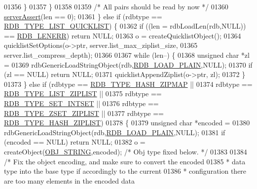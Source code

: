 \begin{DoxyCode}
{{{{{{{{{{{{{{{{{{{{{{{01356             \}
01357         \}
01358 
01359         \textcolor{comment}{/* All pairs should be read by now */}
01360         \hyperlink{server_8h_a88114b5169b4c382df6b56506285e56a}{serverAssert}(len == 0);
01361     \} \textcolor{keywordflow}{else} \textcolor{keywordflow}{if} (rdbtype == \hyperlink{rdb_8h_a391dc0622a3b5f1b3b10c5b5e59eb095}{RDB\_TYPE\_LIST\_QUICKLIST}) \{
01362         \textcolor{keywordflow}{if} ((len = rdbLoadLen(rdb,NULL)) == \hyperlink{rdb_8h_aa66b6ad7261656029e6a67cf78432b2d}{RDB\_LENERR}) \textcolor{keywordflow}{return} NULL;
01363         o = createQuicklistObject();
01364         quicklistSetOptions(o->ptr, server.list\_max\_ziplist\_size,
01365                             server.list\_compress\_depth);
01366 
01367         \textcolor{keywordflow}{while} (len--) \{
01368             \textcolor{keywordtype}{unsigned} \textcolor{keywordtype}{char} *zl =
01369                 rdbGenericLoadStringObject(rdb,\hyperlink{rdb_8h_a5579c0ff24afa891ad41006def040a25}{RDB\_LOAD\_PLAIN},NULL);
01370             \textcolor{keywordflow}{if} (zl == NULL) \textcolor{keywordflow}{return} NULL;
01371             quicklistAppendZiplist(o->ptr, zl);
01372         \}
01373     \} \textcolor{keywordflow}{else} \textcolor{keywordflow}{if} (rdbtype == \hyperlink{rdb_8h_ada37d3f42c37fc3b8894f5c541df5033}{RDB\_TYPE\_HASH\_ZIPMAP}  ||
01374                rdbtype == \hyperlink{rdb_8h_a404cb257f5c3d725f89417ba4f0142c5}{RDB\_TYPE\_LIST\_ZIPLIST} ||
01375                rdbtype == \hyperlink{rdb_8h_a0a267bc10fe879463d503d5182865b86}{RDB\_TYPE\_SET\_INTSET}   ||
01376                rdbtype == \hyperlink{rdb_8h_a844a39336653d28b5a222404cb4a5bd2}{RDB\_TYPE\_ZSET\_ZIPLIST} ||
01377                rdbtype == \hyperlink{rdb_8h_af7ff565f65a30ccd4bf55f1503b63946}{RDB\_TYPE\_HASH\_ZIPLIST})
01378     \{
01379         \textcolor{keywordtype}{unsigned} \textcolor{keywordtype}{char} *encoded =
01380             rdbGenericLoadStringObject(rdb,\hyperlink{rdb_8h_a5579c0ff24afa891ad41006def040a25}{RDB\_LOAD\_PLAIN},NULL);
01381         \textcolor{keywordflow}{if} (encoded == NULL) \textcolor{keywordflow}{return} NULL;
01382         o = createObject(\hyperlink{server_8h_a65236ea160f69cdef33ec942092af88f}{OBJ\_STRING},encoded); \textcolor{comment}{/* Obj type fixed below. */}
01383 
01384         \textcolor{comment}{/* Fix the object encoding, and make sure to convert the encoded}
01385 \textcolor{comment}{         * data type into the base type if accordingly to the current}
01386 \textcolor{comment}{         * configuration there are too many elements in the encoded data}
}}}}}}}}}}}}}}}}}}}}}}}
\end{DoxyCode}
